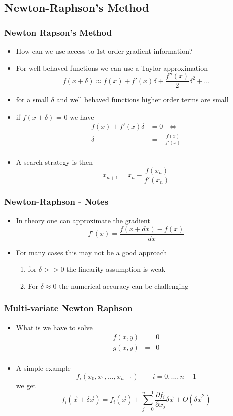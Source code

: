 \documentclass[10pt]{beamer}
\begin{document}
\subsection{Newton-Raphson's Method}

\begin{frame}
  \frametitle{Newton Rapson's Method }
  \begin{itemize}
  \item How can we use access to 1st order gradient information?
  \item For well behaved functions we can use a Taylor approximation
    \[
      f(x + \delta) \approx f(x) + f'(x) \delta + \frac{f''(x)}{2} \delta^2 + \ldots
    \]
  \item for a small $\delta$ and well behaved functions higher order terms are small
  \item if $f(x + \delta)$ = 0 we have
    \[
      \begin{array}{rl}
        f(x) + f'(x) \delta & = 0 ~~~ \Leftrightarrow \\ 
                     \delta & = -\frac{f(x)}{f'(x)}\\
      \end{array}
    \] 
  \item A search strategy is then
    \[
      x_{n+1} = x_n - \frac{f(x_n)}{f'(x_n)}
    \]
  \end{itemize}
\end{frame}

\begin{frame}
  \frametitle{Newton-Raphson - Notes}
  \begin{itemize}
  \item In theory one can approximate the gradient
    \[
      f'(x) = \frac{f(x+dx) - f(x)}{dx}
    \]
  \item For many cases this may not be a good approach
    \begin{enumerate}
    \item for $\delta >> 0$ the linearity assumption is weak
    \item For $\delta \approx 0$ the numerical accuracy can be challenging
    \end{enumerate}
  \end{itemize}
\end{frame}

\begin{frame}
  \frametitle{Multi-variate Newton Raphson}
  \begin{itemize}
  \item What is we have to solve
    \[
      \begin{array}{rcl}
        f(x,y) & = & 0 \\
        g(x,y) & = & 0 \\
      \end{array}
    \]
  \item A simple example
    \[
      f_i (x_0, x_1, \ldots, x_{n-1}) \mbox { ~~~~ } i = 0, ..., n-1
    \]
    we get
    \[
      f_i(\vec{x} + \delta \vec{x}) = f_i(\vec{x}) + \sum_{j=0}^{n-1} \frac{\partial f_i}{\partial x_j}\delta \vec{x} + O(\delta \vec{x}^2)
    \]
  \end{itemize}
\end{frame}
\end{document}

